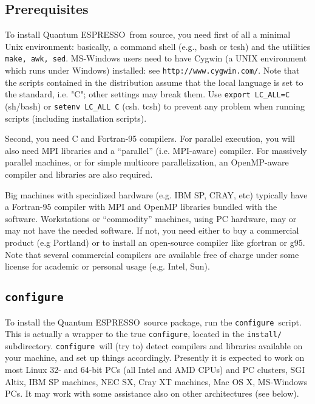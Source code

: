 \documentclass[12pt,a4paper]{article}
\def\qe{{\sc Quantum ESPRESSO}}
\def\configure{\texttt{configure}}
\begin{document}
\subsection{Prerequisites}
\label{Sec:Installation}

To install \qe\ from source, you need first of all a minimal Unix 
environment: basically, a command shell (e.g.,
bash or tcsh) and the utilities \texttt{make, awk, sed}. MS-Windows users need
to have Cygwin (a UNIX environment which runs under Windows) installed:
see \texttt{http://www.cygwin.com/}. Note that the scripts contained in the distribution
assume that the local  language is set to the standard, i.e. "C"; other
 settings 
may break them. Use \texttt{export LC\_ALL=C} (sh/bash) or
\texttt{setenv LC\_ALL C} (csh. tcsh) to prevent any problem 
when running scripts (including installation scripts).

Second, you need C and Fortran-95 compilers. For parallel 
execution, you will also need MPI libraries and a ``parallel''
(i.e. MPI-aware) compiler. For massively parallel machines, or 
for simple multicore parallelization, an OpenMP-aware compiler
and libraries are also required.

Big machines with
specialized hardware (e.g. IBM SP, CRAY, etc) typically have a
Fortran-95 compiler with MPI and OpenMP libraries bundled with 
the software. Workstations or ``commodity'' machines, using PC 
hardware, may or may not have the needed software. If not, you need 
either to buy a commercial product (e.g Portland) or to install
an open-source compiler like gfortran or g95. 
Note that several commercial compilers are available free of charge
under some license for academic or personal usage (e.g. Intel, Sun). 

\subsection{\configure}

To install the \qe\ source package, run the \configure{}ript. This is actually a wrapper to the true \configure,
located in the \texttt{install/} subdirectory. \configure\
will (try to) detect compilers and libraries available on
your machine, and set up things accordingly. Presently it is expected
to work on most Linux 32- and 64-bit PCs (all Intel and AMD CPUs) and PC clusters, SGI Altix, IBM SP  machines, NEC SX, Cray XT
machines, Mac OS X, MS-Windows PCs. It may work with
some assistance also on other architectures (see below). 
\end{document}
